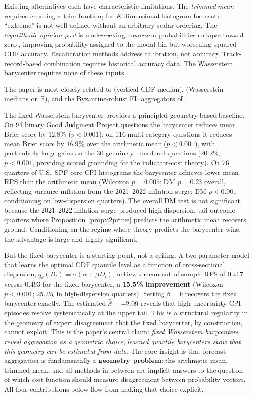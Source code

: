 Existing alternatives each have characteristic limitations.  The \emph{trimmed mean} requires choosing a trim fraction; for $K$-dimensional histogram forecasts ``extreme'' is not well-defined without an arbitrary scalar ordering.  The \emph{logarithmic opinion pool} is mode-seeking: near-zero probabilities collapse toward zero \cite{genest86}, improving probability assigned to the modal bin but worsening squared-CDF accuracy.  Recalibration methods \cite{ranjan10,gneiting13} address calibration, not accuracy.  Track-record-based combination \cite{gneiting07} requires historical accuracy data.  The Wasserstein barycenter requires none of these inputs.

The paper is most closely related to \cite{hora13} (vertical CDF median), \cite{carlier23} (Wasserstein medians on $\mathbb{R}$), and the Byzantine-robust FL aggregators of \cite{yin18}.

The fixed Wasserstein barycenter provides a principled geometry-based baseline.
On 94 binary Good Judgment Project questions the barycenter reduces mean Brier score by $12.8\%$ ($p < 0.001$); on 116 multi-category questions it reduces mean Brier score by $16.9\%$ over the arithmetic mean ($p < 0.001$), with particularly large gains on the 30 genuinely unordered questions ($20.2\%$, $p < 0.001$, providing scored grounding for the indicator-cost theory).
On 76 quarters of U.S.\ SPF core CPI histograms the barycenter achieves lower mean RPS than the arithmetic mean (Wilcoxon $p = 0.005$; DM $p = 0.23$ overall, reflecting variance inflation from the 2021--2022 inflation surge; DM $p < 0.001$ conditioning on low-dispersion quarters).
The overall DM test is not significant because the 2021--2022 inflation surge produced high-dispersion, tail-outcome quarters where Proposition~\ref{prop:c2prime} predicts the arithmetic mean recovers ground.
Conditioning on the regime where theory predicts the barycenter wins, the advantage is large and highly significant.

But the fixed barycenter is a starting point, not a ceiling.
A two-parameter model that learns the optimal CDF quantile level as a function of cross-sectional dispersion, $q_\theta(D_t) = \sigma(\alpha + \beta D_t)$, achieves mean out-of-sample RPS of $0.417$ versus $0.493$ for the fixed barycenter, a \textbf{15.5\% improvement} (Wilcoxon $p < 0.001$; $25.2\%$ in high-dispersion quarters).
Setting $\beta = 0$ recovers the fixed barycenter exactly.
The estimated $\hat\beta = -2.09$ reveals that high-uncertainty CPI episodes resolve systematically at the upper tail. This is a structural regularity in the geometry of expert disagreement that the fixed barycenter, by construction, cannot exploit.
This is the paper's central claim: \emph{fixed Wasserstein barycenters reveal aggregation as a geometric choice; learned quantile barycenters show that this geometry can be estimated from data.}
The core insight is that forecast aggregation is fundamentally a \textbf{geometry problem}: the arithmetic mean, trimmed mean, and all methods in between are implicit answers to the question of which cost function should measure disagreement between probability vectors.
All four contributions below flow from making that choice explicit.


